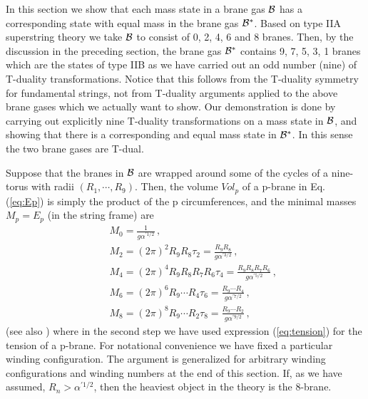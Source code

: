 \documentclass[a4paper,twocolumn,nofootinbib,tightenlines,prd,aps,
               superscriptaddress]{revtex4} %
\newcommand{\al}{\alpha}
\newcommand{\cB}{{\cal{B}}}
\begin{document}
In this section we show that each mass state in a brane gas $\cB$
has a corresponding state with equal mass in the brane gas
$\cB^*$. Based on type IIA superstring theory we take $\cB$ to
consist of 0, 2, 4, 6 and 8 branes. Then, by the discussion in the
preceding section, the brane gas $\cB^*$ contains 9, 7, 5, 3, 1
branes which are the states of type IIB as we have carried out an
odd number (nine) of T-duality transformations. Notice that this
follows from the T-duality symmetry for fundamental strings, not
from T-duality arguments applied to
the above brane gases which we actually want to show.
Our demonstration is
done by carrying out explicitly nine T-duality transformations on
a mass state in $\cB$, and showing that there is a corresponding
and equal mass state in $\cB^*$. In this sense the two  brane
gases are T-dual.

Suppose that the branes in $\cB$ are wrapped around some of the
cycles of a nine-torus with radii $(R_1, \cdots, R_9)$. Then, the
volume $Vol_p$ of a p-brane in Eq. (\ref{eq:Ep}) is simply the
product of the p circumferences, and the minimal masses $M_p =
E_p$ (in the string frame) are
\begin{eqnarray}
  &&  M_{0}=\frac{1}{g \al^{'1/2}} \label{eq:M0}\,,\\
  &&  M_{2}=(2\pi)^2  R_9 R_8 \tau_2 = \frac{R_9 R_8}{g \al^{'3/2}}\,,\label{eq:M2}\\
  &&  M_{4}=(2\pi)^4  R_9 R_8 R_7 R_6 \tau_4 = \frac{R_9 R_8 R_7 R_6}{g \al^{'5/2}}\,,\\
  &&  M_{6}=(2\pi)^6  R_9 \cdots R_4 \tau_6 = \frac{R_9 \cdots R_4}{g \al^{'7/2}}\,,\\
  &&  M_{8}=(2\pi)^8  R_9 \cdots R_2 \tau_8 = \frac{R_9 \cdots R_2}{g
            \al^{'9/2}}\label{eq:M8} \, ,
\end{eqnarray}
(see also \cite{Polchinski:1998rr}) where in the second step we
have used expression (\ref{eq:tension}) for the tension of a
p-brane. For notational convenience we have fixed a
par\-ti\-cu\-lar winding configuration. The argument is
generalized for arbitrary winding configurations and winding
numbers at the end of this section. If, as we have assumed, $R_n
> \al^{' 1/2}$, then the heaviest object in the theory is the
8-brane.
\end{document}
